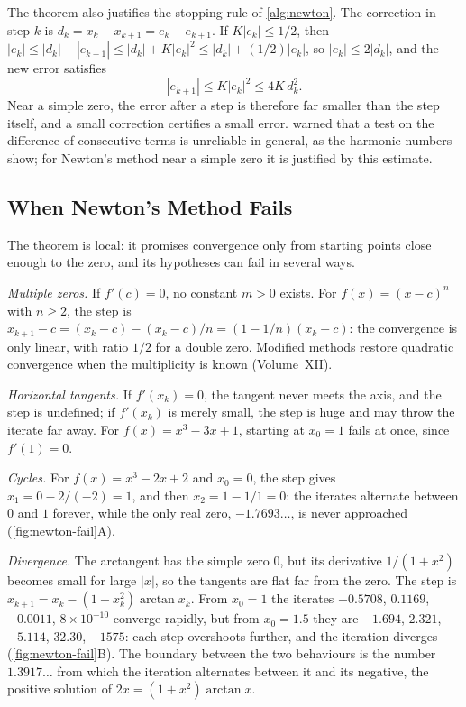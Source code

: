 The theorem also justifies the stopping rule of \cref{alg:newton}. The correction in step $k$ is $d_k=x_k-x_{k+1}=e_k-e_{k+1}$. If $K|e_k|\le1/2$, then $|e_k|\le|d_k|+|e_{k+1}|\le|d_k|+K|e_k|^2\le|d_k|+(1/2)|e_k|$, so $|e_k|\le2|d_k|$, and the new error satisfies
\[
|e_{k+1}|\le K|e_k|^2\le4K\,d_k^2 .
\]
Near a simple zero, the error after a step is therefore far smaller than the step itself, and a small correction certifies a small error.  warned that a test on the difference of consecutive terms is unreliable in general, as the harmonic numbers show; for Newton's method near a simple zero it is justified by this estimate.

\subsection{When Newton's Method Fails}

The theorem is local: it promises convergence only from starting points close enough to the zero, and its hypotheses can fail in several ways.

\emph{Multiple zeros.} If $f'(c)=0$, no constant $m>0$ exists. For $f(x)=(x-c)^n$ with $n\ge2$, the step is $x_{k+1}-c=(x_k-c)-(x_k-c)/n=(1-1/n)(x_k-c)$: the convergence is only linear, with ratio $1/2$ for a double zero. Modified methods restore quadratic convergence when the multiplicity is known (Volume~XII).

\emph{Horizontal tangents.} If $f'(x_k)=0$, the tangent never meets the axis, and the step is undefined; if $f'(x_k)$ is merely small, the step is huge and may throw the iterate far away. For $f(x)=x^3-3x+1$, starting at $x_0=1$ fails at once, since $f'(1)=0$.

\emph{Cycles.} For $f(x)=x^3-2x+2$ and $x_0=0$, the step gives $x_1=0-2/(-2)=1$, and then $x_2=1-1/1=0$: the iterates alternate between $0$ and $1$ forever, while the only real zero, $-1.7693\ldots$, is never approached (\cref{fig:newton-fail}A).

\emph{Divergence.} The arctangent has the simple zero $0$, but its derivative $1/(1+x^2)$ becomes small for large $|x|$, so the tangents are flat far from the zero. The step is $x_{k+1}=x_k-(1+x_k^2)\arctan x_k$. From $x_0=1$ the iterates $-0.5708$, $0.1169$, $-0.0011$, $8\times10^{-10}$ converge rapidly, but from $x_0=1.5$ they are $-1.694$, $2.321$, $-5.114$, $32.30$, $-1575$: each step overshoots further, and the iteration diverges (\cref{fig:newton-fail}B). The boundary between the two behaviours is the number $1.3917\ldots$ from which the iteration alternates between it and its negative, the positive solution of $2x=(1+x^2)\arctan x$.

